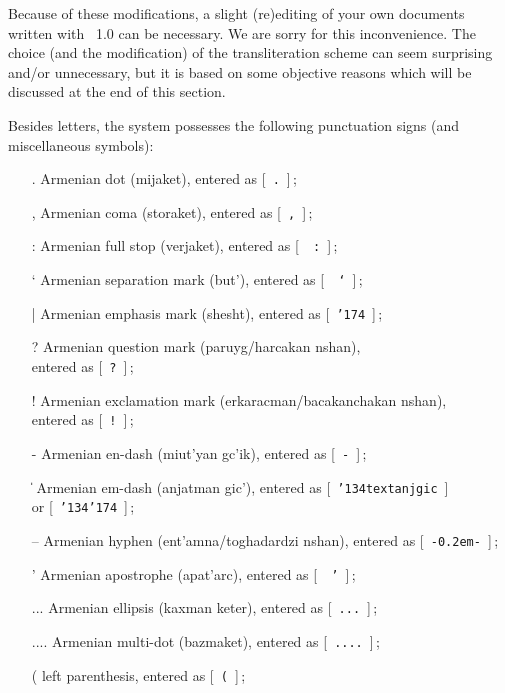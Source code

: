 \documentclass[12pt,a4paper,draft]{article}
\def\mybs{\char'134}
\def\mybar{\char'174}
\begin{document}
Because of these modifications, a slight (re)editing of your own documents
written with \latArmTeX\ 1.0 can be necessary. We are sorry for this
inconvenience. The choice (and the modification) of the transliteration scheme
can seem surprising and/or unnecessary, but it is based on some objective
reasons which will be discussed at the end of this section.

Besides letters, the system possesses the following punctuation signs (and
miscellaneous symbols):

\begin{itemize}
\item[\artm .]\quad Armenian dot ({\artm mijaket}), entered as [~{\tt .}~]$\,$;
\item[\artm ,]\quad Armenian coma ({\artm storaket}), entered as [~{\tt ,}~]$\,$;
\item[\artm :]\quad Armenian full stop ({\artm verjaket}), entered as [~{\tt
    :}~]$\,$;
\item[\artm `]\quad Armenian separation mark ({\artm but'}), entered as [~{\tt
    `}~]$\,$;
\item[\artm |]\quad Armenian emphasis mark ({\artm shesht}), entered as
  [~{\tt\mybar}~]$\,$;
\item[\artm ?]\quad Armenian question mark ({\artm paruyg/harcakan
  nshan}),\\ \null\quad entered as [~{\tt ?}~]$\,$;
\item[\artm !]\quad Armenian exclamation mark ({\artm erkaracman/bacakanchakan
  nshan}),\\ \null\quad entered as [~{\tt !}~]$\,$;
\item[\artm -]\quad Armenian en-dash ({\artm miut'yan gc'ik}), entered as
  [~{\tt -}~]$\,$;
\item[\artm \|]\quad Armenian em-dash ({\artm anjatman gic'}), entered as
  [~{\tt \mybs textanjgic}~]\\ \null\quad or [~{\tt \mybs\mybar}~]$\,$;
\item[\artm --]\quad Armenian hyphen ({\artm ent'amna/toghadardzi nshan}),
  entered as [~{\tt -{\kern0.2em}-}~]$\,$;
\item[\artm ']\quad Armenian apostrophe ({\artm apat'arc}), entered as [~{\tt
    '}~]$\,$;
\item[\artm ...]\quad Armenian ellipsis ({\artm kaxman keter)}, entered as
  [~{\tt ...}~]$\,$;
\item[\artm ....]\quad Armenian multi-dot ({\artm bazmaket}), entered as
  [~{\tt ....}~]$\,$;
\item[\artm (]\quad left parenthesis, entered as [~{\tt (}~]$\,$;

\end{itemize}
\end{document}
